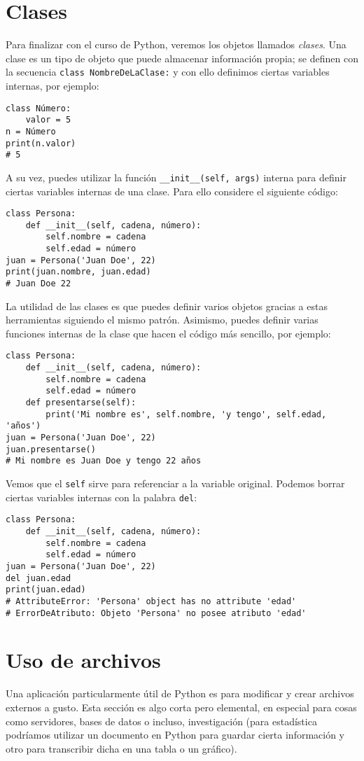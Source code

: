\documentclass[11pt,twoside]{report}
\begin{document}
\section{Clases}
Para finalizar con el curso de Python, veremos los objetos llamados \textit{clases}. Una clase es un tipo de objeto que puede almacenar información propia; se definen con la secuencia \lstinline|class NombreDeLaClase:| y con ello definimos ciertas variables internas, por ejemplo:
\begin{lstlisting}
class Número:
	valor = 5
n = Número
print(n.valor)
# 5
\end{lstlisting}
A su vez, puedes utilizar la función \lstinline|__init__(self, args)| interna para definir ciertas variables internas de una clase. Para ello considere el siguiente código:
\begin{lstlisting}
class Persona:
	def __init__(self, cadena, número):
		self.nombre = cadena
		self.edad = número
juan = Persona('Juan Doe', 22)
print(juan.nombre, juan.edad)
# Juan Doe 22
\end{lstlisting}
La utilidad de las clases es que puedes definir varios objetos gracias a estas herramientas siguiendo el mismo patrón. Asimismo, puedes definir varias funciones internas de la clase que hacen el código más sencillo, por ejemplo:
\begin{lstlisting}
class Persona:
	def __init__(self, cadena, número):
		self.nombre = cadena
		self.edad = número
	def presentarse(self):
		print('Mi nombre es', self.nombre, 'y tengo', self.edad, 'años')
juan = Persona('Juan Doe', 22)
juan.presentarse()
# Mi nombre es Juan Doe y tengo 22 años
\end{lstlisting}
Vemos que el \lstinline|self| sirve para referenciar a la variable original. Podemos borrar ciertas variables internas con la palabra \lstinline|del|:
\begin{lstlisting}
class Persona:
	def __init__(self, cadena, número):
		self.nombre = cadena
		self.edad = número
juan = Persona('Juan Doe', 22)
del juan.edad
print(juan.edad)
# AttributeError: 'Persona' object has no attribute 'edad'
# ErrorDeAtributo: Objeto 'Persona' no posee atributo 'edad'
\end{lstlisting}

\section{Uso de archivos}
Una aplicación particularmente útil de Python es para modificar y crear archivos externos a gusto. Esta sección es algo corta pero elemental, en especial para cosas como servidores, bases de datos o incluso, investigación (para estadística podríamos utilizar un documento en Python para guardar cierta información  y otro para transcribir dicha en una tabla o un gráfico).
\end{document}
